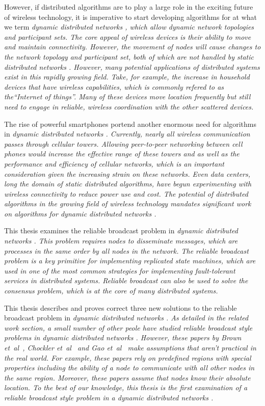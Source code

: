 \documentclass[english]{article}
\begin{document}
However, if distributed algorithms are to play a large role in the exciting future of wireless technology, it is imperative to start developing algorithms for at what we term \em dynamic distributed networks \em, which allow dynamic network topologies and participant sets. The core appeal of wireless devices is their ability to move and maintain connectivity. However, the movement of nodes will cause changes to the network topology and participant set, both of which are not handled by \em static distributed networks \em. However, many potential applications of distributed systems exist in this rapidly growing field. Take, for example, the increase in household devices that have wireless capabilities, which is commonly refered to as the``Internet of things''. Many of these devices move location frequently but still need to engage in reliable, wireless coordination with the other scattered devices.

The rise of powerful smartphones portend another enormous need for algorithms in \em dynamic distributed networks \em. Currently, nearly all wireless communication passes through cellular towers. Allowing peer-to-peer networking between cell phones would increase the effective range of these towers and as well as the performance and efficiency of cellular networks, which is an important consideration given the increasing strain on these networks. Even data centers, long the domain of static distributed algorithms, have begun experimenting with wireless connectivity to reduce power use and cost. The potential of distributed algorithms in the growing field of wireless technology mandates significant work on algorithms for \em dynamic distributed networks \em.

This thesis examines the reliable broadcast problem in \em dynamic distributed networks \em. This problem requires nodes to disseminate messages, which are processes in the same order by all nodes in the network. The reliable broadcast problem is a key primitive for implementing replicated state machines, which are used in one of the most common strategies for implementing fault-tolerant services in distributed systems. Reliable broadcast can also be used to solve the consensus problem, which is at the core of many distributed systems.

This thesis describes and proves correct three new solutions to the reliable broadcast problem in \em dynamic distributed networks \em. As detailed in the related work section, a small number of other peole have studied reliable broadcast style problems in \em dynamic distributed networks \em. However, these papers by Brown et~al~\cite{Brown:2007}, Chockler et~al~\cite{Chockler:2008} and Gao et~al~\cite{Gao:2012} make assumptions that aren't practical in the real world. For example, these papers rely on predefined regions with special properties including the ability of a node to communicate with all other nodes in the same region. Moreover, these papers assume that nodes know their absolute location. To the best of our knowledge, this thesis is the first examination of a reliable broadcast style problem in a \em dynamic distributed networks \em.
\end{document}
